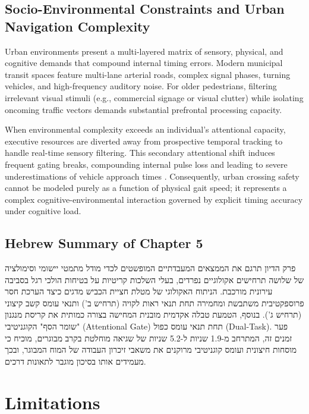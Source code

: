 \documentclass{custom_report}
\begin{document}
\section{Socio-Environmental Constraints and Urban Navigation Complexity}
Urban environments present a multi-layered matrix of sensory, physical, and cognitive demands that compound internal timing errors. Modern municipal transit spaces feature multi-lane arterial roads, complex signal phases, turning vehicles, and high-frequency auditory noise. For older pedestrians, filtering irrelevant visual stimuli (e.g., commercial signage or visual clutter) while isolating oncoming traffic vectors demands substantial prefrontal processing capacity. 

When environmental complexity exceeds an individual's attentional capacity, executive resources are diverted away from prospective temporal tracking to handle real-time sensory filtering. This secondary attentional shift induces frequent gating breaks, compounding internal pulse loss and leading to severe underestimations of vehicle approach times \cite{Carrigan2026}. Consequently, urban crossing safety cannot be modeled purely as a function of physical gait speed; it represents a complex cognitive-environmental interaction governed by explicit timing accuracy under cognitive load.

\section{Hebrew Summary of Chapter 5}
פרק הדיון תרגם את הממצאים המעבדתיים המופשטים לכדי מודל מתמטי יישומי וסימולציה של שלושה תרחישים אקולוגיים נפרדים, בעלי השלכות קריטיות על בטיחות הולכי רגל בסביבה עירונית מורכבת. הניתוח האקולוגי של מטלת חציית הכביש מדגים כיצד הערכת חסר פרוספקטיבית משתבשת ומחמירה תחת תנאי ראות לקויה (תרחיש ב') ותנאי עומס קשב קיצוני (תרחיש ג'). בנוסף, הטמעת טבלה אקדמית מובנית המחישה בצורה כמותית את קריסת מנגנון "שומר הסף" הקוגניטיבי (Attentional Gate) תחת תנאי עומס כפול (Dual-Task). פער זמנים זה, המתרחב מ-1.9 שניות ל-5.2 שניות של שגיאה מוחלטת בקרב מבוגרים, מוכיח כי מוסחות חיצונית ועומס קוגניטיבי מרוקנים את משאבי זיכרון העבודה של המוח המבוגר, ובכך מעמידים אותו בסיכון מוגבר לתאונות דרכים.

\newpage

\chapter{Limitations}
\label{ch:limitations}
\end{document}
